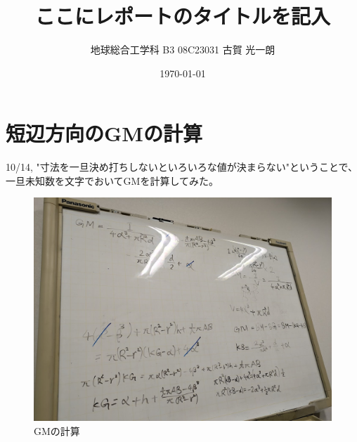 \documentclass[11pt, dvipdfmx]{jsarticle}
\title{ここにレポートのタイトルを記入}
\author{地球総合工学科 \quad B3 \quad 08C23031 \quad 古賀 光一朗}
\date{\today}
\begin{document}
\maketitle

\section{短辺方向のGMの計算}
10/14, "寸法を一旦決め打ちしないといろいろな値が決まらない"ということで、一旦未知数を文字でおいてGMを計算してみた。

\begin{figure}[H]
    \centering
    \includegraphics[width=0.7\linewidth]{gm_01.png}   
    \caption{GMの計算}
    \label{fig:gm_calculation}
\end{figure}
\end{document}
